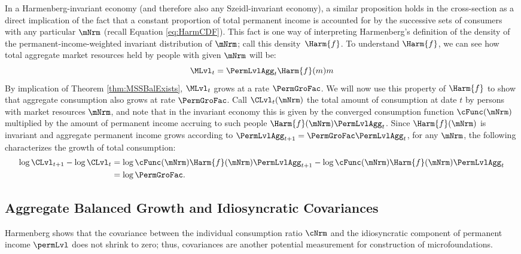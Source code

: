 \documentclass[BufferStockTheory]{subfiles}
\begin{document}
In a Harmenberg-invariant economy (and therefore also any Szeidl-invariant economy), a similar proposition holds in the cross-section as a direct implication of the fact that a constant proportion of total permanent income is accounted for by the successive sets of consumers with any particular $\mNrm$ (recall Equation \eqref{eq:HarmCDF}).
This fact is one way of interpreting Harmenberg's definition of the density of the permanent-income-weighted invariant distribution of $\mNrm$; call this density~$\Harm{f}$.
To understand $\Harm{f}$, we can see how total aggregate market resources held by people with given $\mNrm$ will be:
%
%
\begin{equation}
\MLvl_{t}=\PermLvlAgg_{t}\Harm{f}(m)m
\end{equation}
%
%
By implication of Theorem \ref{thm:MSSBalExists}, $\MLvl_{t}$ grows at a rate $\PermGroFac$.
We will now use this property of $\Harm{f}$ to show that aggregate consumption also grows at rate $\PermGroFac$.
Call $\CLvl_{t}(\mNrm)$ the total amount of consumption at date $t$ by persons with market resources $\mNrm$, and note that in the invariant economy this is given by the converged consumption function $\cFunc(\mNrm)$ multiplied by the amount of permanent income accruing to such people $\Harm{f}(\mNrm)\PermLvlAgg_{t}$.
Since $\Harm{f}(\mNrm)$ is invariant and aggregate permanent income grows according to $\PermLvlAgg_{t+1} = \PermGroFac \PermLvlAgg_{t}$, for any $\mNrm$, the following characterizes the growth of total consumption:
%
%
\begin{equation*}
  \begin{aligned}
    \log \CLvl_{t+1} - \log \CLvl_{t} &  \notag
    = \log \cFunc(\mNrm) \Harm{f}(\mNrm)\PermLvlAgg_{t+1} - \log \cFunc(\mNrm)\Harm{f}(\mNrm)\PermLvlAgg_{t} \\
    & = \log \PermGroFac.
  \end{aligned}
\end{equation*}



\hypertarget{Balanced-Growth-Of-Covariances}{}
\subsection{Aggregate Balanced Growth and Idiosyncratic Covariances}\label{subsec:Covariances}

Harmenberg shows that the covariance between the individual consumption ratio $\cNrm$ and the idiosyncratic component of permanent income $\permLvl$ does not shrink to zero; thus, covariances are another potential measurement for construction of microfoundations.
\end{document}

